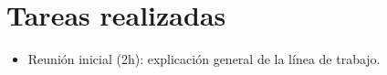 \chapter{Tareas realizadas\label{tasks}}

\begin{itemize}

\item Reunión inicial (2h): explicación general de la línea de trabajo.

\end{itemize}


